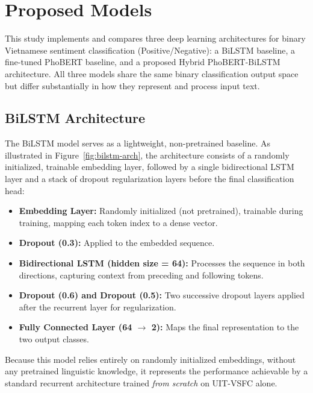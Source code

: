 \documentclass[12pt]{report} %
\begin{document}
\section{Proposed Models}

This study implements and compares three deep learning architectures for binary Vietnamese sentiment classification (Positive/Negative): a BiLSTM baseline, a fine-tuned PhoBERT baseline, and a proposed Hybrid PhoBERT-BiLSTM architecture. All three models share the same binary classification output space but differ substantially in how they represent and process input text.

\subsection{BiLSTM Architecture}

The BiLSTM model serves as a lightweight, non-pretrained baseline. As illustrated in Figure~\ref{fig:bilstm-arch}, the architecture consists of a randomly initialized, trainable embedding layer, followed by a single bidirectional LSTM layer and a stack of dropout regularization layers before the final classification head:
\begin{itemize}
    \item \textbf{Embedding Layer:} Randomly initialized (not pretrained), trainable during training, mapping each token index to a dense vector.
    \item \textbf{Dropout (0.3):} Applied to the embedded sequence.
    \item \textbf{Bidirectional LSTM (hidden size = 64):} Processes the sequence in both directions, capturing context from preceding and following tokens.
    \item \textbf{Dropout (0.6) and Dropout (0.5):} Two successive dropout layers applied after the recurrent layer for regularization.
    \item \textbf{Fully Connected Layer (64 $\rightarrow$ 2):} Maps the final representation to the two output classes.
\end{itemize}
Because this model relies entirely on randomly initialized embeddings, without any pretrained linguistic knowledge, it represents the performance achievable by a standard recurrent architecture trained \textit{from scratch} on UIT-VSFC alone.
\end{document}
